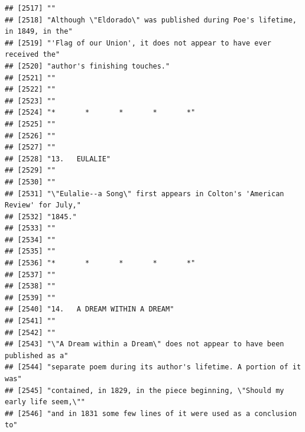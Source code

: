 \documentclass{article}\usepackage[]{graphicx}\usepackage[]{color}
\makeatletter
\newenvironment{kframe}{%
 \def\at@end@of@kframe{}%
 \ifinner\ifhmode%
  \def\at@end@of@kframe{\end{minipage}}%
  \begin{minipage}{\columnwidth}%
 \fi\fi%
 \def\FrameCommand##1{\hskip\@totalleftmargin \hskip-\fboxsep
 \colorbox{shadecolor}{##1}\hskip-\fboxsep
     \hskip-\linewidth \hskip-\@totalleftmargin \hskip\columnwidth}%
 \MakeFramed {\advance\hsize-\width
   \@totalleftmargin\z@ \linewidth\hsize
   \@setminipage}}%
 {\par\unskip\endMakeFramed%
 \at@end@of@kframe}
\newenvironment{knitrout}{}{} %
\makeatother
\begin{document}
\begin{knitrout}
\begin{kframe}
\begin{verbatim}
## [2517] ""                                                                            
## [2518] "Although \"Eldorado\" was published during Poe's lifetime, in 1849, in the"  
## [2519] "'Flag of our Union', it does not appear to have ever received the"           
## [2520] "author's finishing touches."                                                 
## [2521] ""                                                                            
## [2522] ""                                                                            
## [2523] ""                                                                            
## [2524] "*       *       *       *       *"                                           
## [2525] ""                                                                            
## [2526] ""                                                                            
## [2527] ""                                                                            
## [2528] "13.   EULALIE"                                                               
## [2529] ""                                                                            
## [2530] ""                                                                            
## [2531] "\"Eulalie--a Song\" first appears in Colton's 'American Review' for July,"   
## [2532] "1845."                                                                       
## [2533] ""                                                                            
## [2534] ""                                                                            
## [2535] ""                                                                            
## [2536] "*       *       *       *       *"                                           
## [2537] ""                                                                            
## [2538] ""                                                                            
## [2539] ""                                                                            
## [2540] "14.   A DREAM WITHIN A DREAM"                                                
## [2541] ""                                                                            
## [2542] ""                                                                            
## [2543] "\"A Dream within a Dream\" does not appear to have been published as a"      
## [2544] "separate poem during its author's lifetime. A portion of it was"             
## [2545] "contained, in 1829, in the piece beginning, \"Should my early life seem,\""  
## [2546] "and in 1831 some few lines of it were used as a conclusion to"               

\end{verbatim}
\end{kframe}
\end{knitrout}
\end{document}
